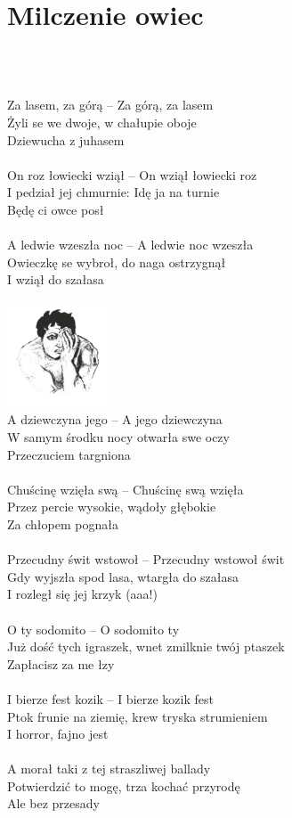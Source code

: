 \documentclass[a5paper, 10pt]{book}
\begin{document}
\newpage
\section{Milczenie owiec}\textcolor{lightgray}{\textit{}}\\~\\
\begin{minipage}[t]{0.8\textwidth}
Za lasem, za górą – Za górą, za lasem\\
Żyli se we dwoje, w chałupie oboje\\
Dziewucha z juhasem\\
\\
On roz łowiecki wziął – On wziął łowiecki roz\\
I pedział jej chmurnie: Idę ja na turnie\\
Będę ci owce posł\\
\\
A ledwie wzeszła noc – A ledwie noc wzeszła\\
Owieczkę se wybroł, do naga ostrzygnął\\
I wziął do szałasa\\
\\
\includegraphics[height=3cm, right]{images/milczenie_owiec.png}\vspace*{-3.05cm}\\
A dziewczyna jego – A jego dziewczyna\\
W samym środku nocy otwarła swe oczy\\
Przeczuciem targniona\\
\\
Chuścinę wzięła swą – Chuścinę swą wzięła\\
Przez percie wysokie, wądoły głębokie\\
Za chłopem pognała\\
\\
Przecudny świt wstowoł – Przecudny wstowoł świt\\
Gdy wyjszła spod lasa, wtargła do szałasa\\
I rozległ się jej krzyk (aaa!)\\
\\
O ty sodomito – O sodomito ty\\
Już dość tych igraszek, wnet zmilknie twój ptaszek\\
Zapłacisz za me łzy\\
\\
I bierze fest kozik – I bierze kozik fest\\
Ptok frunie na ziemię, krew tryska strumieniem\\
I horror, fajno jest\\
\\
A morał taki z tej straszliwej ballady\\
Potwierdzić to mogę, trza kochać przyrodę\\
Ale bez przesady\\
\end{minipage}
\end{document}
